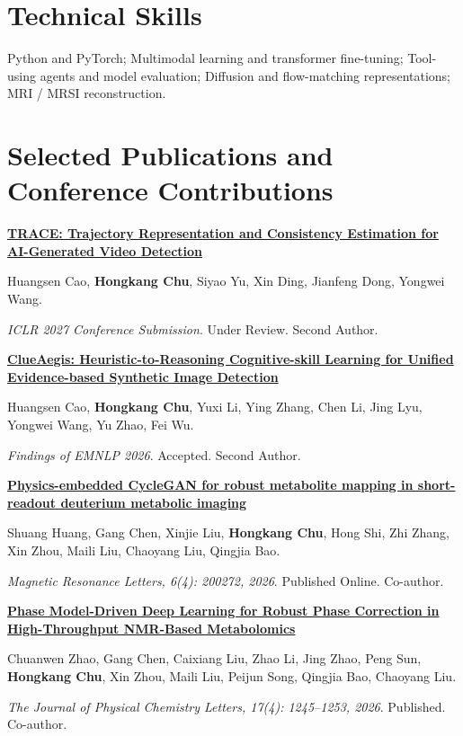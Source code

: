 \documentclass[10pt,letterpaper]{article}
\begin{document}
\section{Technical Skills}
Python and PyTorch; Multimodal learning and transformer fine-tuning; Tool-using agents and model evaluation; Diffusion and flow-matching representations; MRI / MRSI reconstruction.
\newpage
\section{Selected Publications and Conference Contributions}
\begin{minipage}{\linewidth}
\small\textbf{\href{https://openreview.net/forum?id=erYE1VciKv}{TRACE: Trajectory Representation and Consistency Estimation for AI-Generated Video Detection}}\par
Huangsen Cao, \textbf{Hongkang Chu}, Siyao Yu, Xin Ding, Jianfeng Dong, Yongwei Wang.\par
\textit{ICLR 2027 Conference Submission}. Under Review. Second Author.\end{minipage}\par\vspace{13pt}
\begin{minipage}{\linewidth}
\small\textbf{\href{https://openreview.net/forum?id=Hxm5eSFUT9}{ClueAegis: Heuristic-to-Reasoning Cognitive-skill Learning for Unified Evidence-based Synthetic Image Detection}}\par
Huangsen Cao, \textbf{Hongkang Chu}, Yuxi Li, Ying Zhang, Chen Li, Jing Lyu, Yongwei Wang, Yu Zhao, Fei Wu.\par
\textit{Findings of EMNLP 2026}. Accepted. Second Author.\end{minipage}\par\vspace{13pt}
\begin{minipage}{\linewidth}
\small\textbf{\href{https://doi.org/10.1016/j.mrl.2026.200272}{Physics-embedded CycleGAN for robust metabolite mapping in short-readout deuterium metabolic imaging}}\par
Shuang Huang, Gang Chen, Xinjie Liu, \textbf{Hongkang Chu}, Hong Shi, Zhi Zhang, Xin Zhou, Maili Liu, Chaoyang Liu, Qingjia Bao.\par
\textit{Magnetic Resonance Letters, 6(4): 200272, 2026}. Published Online. Co-author.\end{minipage}\par\vspace{13pt}
\begin{minipage}{\linewidth}
\small\textbf{\href{https://doi.org/10.1021/acs.jpclett.5c03529}{Phase Model-Driven Deep Learning for Robust Phase Correction in High-Throughput NMR-Based Metabolomics}}\par
Chuanwen Zhao, Gang Chen, Caixiang Liu, Zhao Li, Jing Zhao, Peng Sun, \textbf{Hongkang Chu}, Xin Zhou, Maili Liu, Peijun Song, Qingjia Bao, Chaoyang Liu.\par
\textit{The Journal of Physical Chemistry Letters, 17(4): 1245--1253, 2026}. Published. Co-author.\end{minipage}\par\vspace{13pt}
\end{document}
